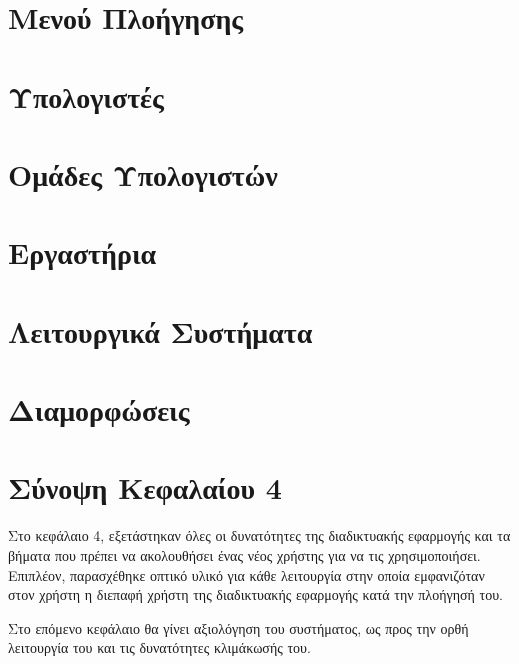 \FloatBarrier

\section{Μενού Πλοήγησης}

\section{Υπολογιστές}

\section{Ομάδες Υπολογιστών}

\section{Εργαστήρια}

\section{Λειτουργικά Συστήματα}

\section{Διαμορφώσεις}

\section{Σύνοψη Κεφαλαίου 4}
Στο κεφάλαιο 4, εξετάστηκαν όλες οι δυνατότητες της διαδικτυακής εφαρμογής και τα βήματα που πρέπει να ακολουθήσει ένας νέος χρήστης για να τις χρησιμοποιήσει. Επιπλέον, παρασχέθηκε οπτικό υλικό για κάθε λειτουργία στην οποία εμφανιζόταν στον χρήστη η διεπαφή χρήστη της διαδικτυακής εφαρμογής κατά την πλοήγησή του.

Στο επόμενο κεφάλαιο θα γίνει αξιολόγηση του συστήματος, ως προς την ορθή λειτουργία του και τις δυνατότητες κλιμάκωσής του.
